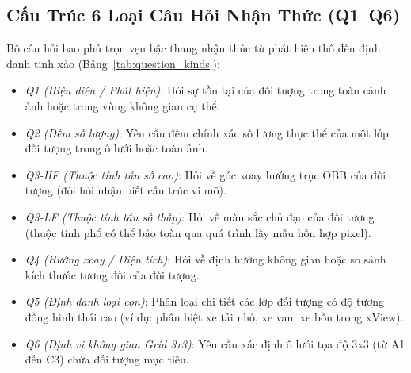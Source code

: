 \subsection{Cấu Trúc 6 Loại Câu Hỏi Nhận Thức (Q1--Q6)}
Bộ câu hỏi bao phủ trọn vẹn bậc thang nhận thức từ phát hiện thô đến định danh tinh xảo (Bảng~\ref{tab:question_kinds}):
\begin{itemize}
    \item \textit{Q1 (Hiện diện / Phát hiện)}: Hỏi sự tồn tại của đối tượng trong toàn cảnh ảnh hoặc trong vùng không gian cụ thể.
    \item \textit{Q2 (Đếm số lượng)}: Yêu cầu đếm chính xác số lượng thực thể của một lớp đối tượng trong ô lưới hoặc toàn ảnh.
    \item \textit{Q3-HF (Thuộc tính tần số cao)}: Hỏi về góc xoay hướng trục OBB của đối tượng (đòi hỏi nhận biết cấu trúc vi mô).
    \item \textit{Q3-LF (Thuộc tính tần số thấp)}: Hỏi về màu sắc chủ đạo của đối tượng (thuộc tính phổ có thể bảo toàn qua quá trình lấy mẫu hỗn hợp pixel).
    \item \textit{Q4 (Hướng xoay / Diện tích)}: Hỏi về định hướng không gian hoặc so sánh kích thước tương đối của đối tượng.
    \item \textit{Q5 (Định danh loại con)}: Phân loại chi tiết các lớp đối tượng có độ tương đồng hình thái cao (ví dụ: phân biệt xe tải nhỏ, xe van, xe bồn trong xView).
    \item \textit{Q6 (Định vị không gian Grid 3x3)}: Yêu cầu xác định ô lưới tọa độ 3x3 (từ A1 đến C3) chứa đối tượng mục tiêu.
\end{itemize}

\begin{table}[t]
\centering
\caption{Phân bố các dạng câu hỏi và số lượng mẫu trong bộ chuẩn RS-Resolve.}
\label{tab:question_kinds}
\end{table}

